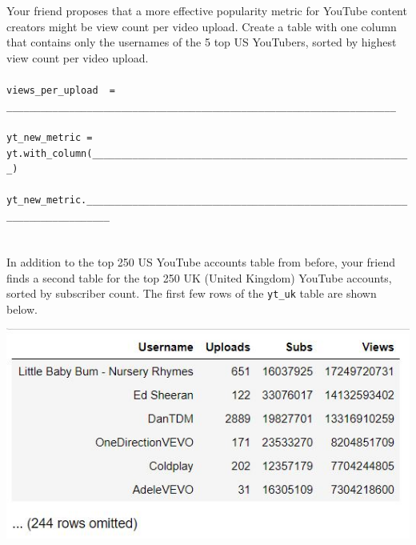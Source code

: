 \begin{enumerate}
 Your friend proposes that a more effective popularity metric for YouTube content creators might be view count per video upload. Create a table with one column that contains only the usernames of the 5 top US YouTubers, sorted by highest view count per video upload.\\ \\
\lstinline{views_per_upload  = ____________________________________________________________________} \\ \\
\lstinline{yt_new_metric =  yt.with_column(________________________________________________________)} \\ \\
\lstinline{yt_new_metric.__________________________________________________________________________}\\ \\
\\


In addition to the top 250 US YouTube accounts table from before, your friend finds a second table for the top 250 UK (United Kingdom) YouTube accounts, sorted by subscriber count. The first few rows of the {\tt yt\_uk} table are shown below. \\

\begin{center}
\includegraphics[scale=0.9]{youtubers_tbl_uk.JPG}
\end{center}


\end{enumerate}
